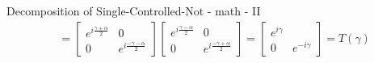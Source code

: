\documentclass{beamer}
\begin{document}
\begin{frame}{Decomposition of Single-Controlled-Not - math - II}
{\begin{align*}
      &=
      \begin{bmatrix} 
        e^{i\frac{\gamma + \alpha}{2}} & 0\\
        0 & e^{i\frac{-\gamma - \alpha}{2}}
      \end{bmatrix} 
      \begin{bmatrix} 
        e^{i\frac{\gamma - \alpha}{2}} & 0 \\
        0 & e^{i\frac{-\gamma + \alpha}{2}}
      \end{bmatrix} 
      =
      \begin{bmatrix} 
        e^{i\gamma} \\
        0 & e^{-i\gamma}
      \end{bmatrix} 
      = T(\gamma)
    \end{align*}
  }%
\end{frame}
\end{document}

